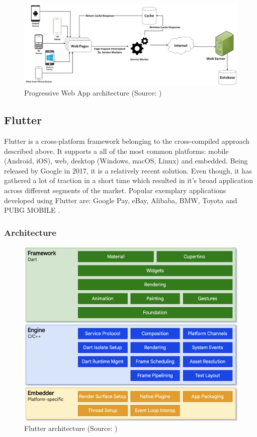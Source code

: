 \begin{figure}[h]
	\centering
	\includegraphics[width=\textwidth]{img/pwa}
	\caption{Progressive Web App architecture (Source: \cite{dawning_pwa})}
	\label{fig:pwa_architecture}
\end{figure}

\subsection{Flutter}

Flutter is a cross-platform framework belonging to the cross-compiled approach described above. It supports a all of the most common platforms: mobile (Android, iOS), web, desktop (Windows, macOS, Linux) and embedded. Being released by Google in 2017, it is a relatively recent solution. Even though, it has gathered a lot of traction in a short time which resulted in it's broad application across different segments of the market. Popular exemplary applications developed using Flutter are: Google Pay, eBay, Alibaba, BMW, Toyota and PUBG MOBILE \cite{flutter_showcase,flutter_docs_architecture}. 

\subsubsection*{Architecture}

\begin{figure}[h]
	\centering
	\includegraphics[width=.77\textwidth]{img/flutter_architecture}
	\caption{Flutter architecture (Source: \cite{flutter_docs_architecture})}
	\label{fig:flutter_architecture}
\end{figure}


